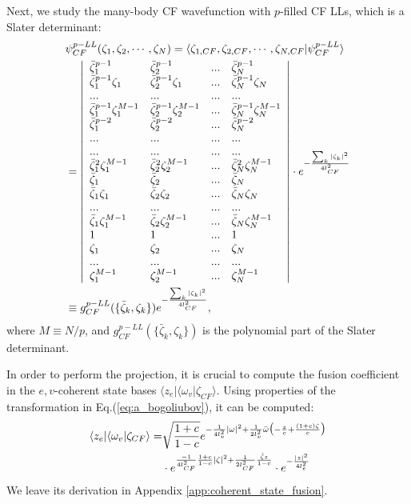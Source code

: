 Next, we study the many-body CF wavefunction with $p$-filled CF LLs, which is a Slater determinant:
\begin{align}
&\psi^{p-LL}_{CF}(\zeta_1,\zeta_2,\cdots,\zeta_N)=\langle  \zeta_{1,CF},\zeta_{2,CF},\cdots,\zeta_{N,CF} |\psi^{p-LL}_{CF}\rangle\notag\\
&=\left|\begin{array}{llll} \bar\zeta_1^{p-1}&  \bar\zeta_2^{p-1} & ... &  \bar\zeta_N^{p-1}\\
\bar\zeta_1^{p-1}\zeta_1&  \bar\zeta_2^{p-1}\zeta_1 & ... &  \bar\zeta_N^{p-1}\zeta_N\\
... & ...& ...& ...\\
\bar\zeta_1^{p-1}\zeta_1^{M-1}& \bar\zeta_2^{p-1}\zeta_2^{M-1}& ...& \bar\zeta_N^{p-1}\zeta_N^{M-1}\\
\bar\zeta_1^{p-2}&  \bar\zeta_2^{p-2} & ... &  \bar\zeta_N^{p-2}\\
... & ...& ...& ...\\
... & ...& ...& ...\\
\bar\zeta_1^{2}\zeta_1^{M-1}& \bar\zeta_2^{2}\zeta_2^{M-1}& ...& \bar\zeta_N^{2}\zeta_N^{M-1}\\
\bar\zeta_1&  \bar\zeta_2 & ... &  \bar\zeta_N\\
\bar\zeta_1 \zeta_1&  \bar\zeta_2 \zeta_2 & ... &  \bar\zeta_N \zeta_N\\
... & ...& ...& ...\\
\bar\zeta_1 \zeta_1^{M-1}&  \bar\zeta_2 \zeta_2^{M-1} & ... &  \bar\zeta_N \zeta_N^{M-1}\\
1&  1 & ... &  1\\
\zeta_1&  \zeta_2 & ... &  \zeta_N\\
... & ...& ...& ...\\
 \zeta_1^{M-1}&   \zeta_2^{M-1} & ... &   \zeta_N^{M-1}\\
\end{array} \right|\cdot e^{-\frac{\sum_k|\zeta_k|^2}{4l_{CF}^2}}\notag\\
&\equiv g^{p-LL}_{CF}(\{\bar\zeta_k,\zeta_k\})e^{-\frac{\sum_k|\zeta_k|^2}{4l_{CF}^2}} ,\label{eq:p_2_slater}
\end{align}
where $M\equiv N/p$, and $g^{p-LL}_{CF}(\{\bar\zeta_k,\zeta_k\})$ is the polynomial part of the Slater determinant.

In order to perform the projection, it is crucial to compute the fusion coefficient in the $e,v$-coherent state bases $\langle z_e|\langle\omega_v|\zeta_{CF}\rangle$. Using properties of the transformation in Eq.(\ref{eq:a_bogoliubov}), it can be computed:
\begin{align}
\langle z_e|\langle\omega_v|\zeta_{CF}\rangle =& \sqrt{\frac{1+c}{1-c}}e^{-\frac{1}{4l_v^2}|\omega|^2+\frac{1}{2l_v^2}\bar\omega\big(-\frac{z}{c}+\frac{(1+c) \zeta}{c}\big)}\notag\\
&\cdot e^{\frac{-1}{4l_{CF}^2}\frac{1+c}{1-c}\left|\zeta\right|^2+\frac{1}{2l_{CF}^2}\frac{\bar\zeta z}{1-c}}\cdot e^{-\frac{|z|^2}{4l_e^2}}\label{eq:coherent_state_fusion}
\end{align}
We leave its derivation in Appendix \ref{app:coherent_state_fusion}.


